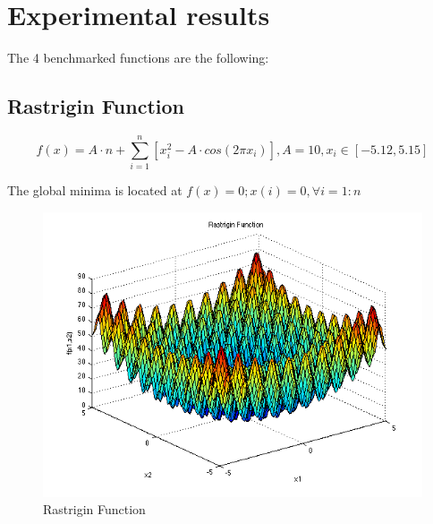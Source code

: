 \documentclass{article}
\begin{document}
\section{Experimental results}
The 4 benchmarked functions are the following:

\subsection{Rastrigin Function\cite{Rastrigin}}

$$ f(x) = A \cdot n + \sum_{i=1}^n \left[ x_i^2 - A \cdot cos(2 \pi x_i) \right],
A = 10, x_i \in \left[ -5.12, 5.15 \right]$$

The global minima is located at $f(x)=0; x(i)=0,  \forall i=1:n $
\begin{figure}[!h]
  \includegraphics[width=\textwidth,height=\textheight,keepaspectratio]{rastr.png}
  \caption{Rastrigin Function\cite{rast_img}}
\end{figure}
\end{document}
